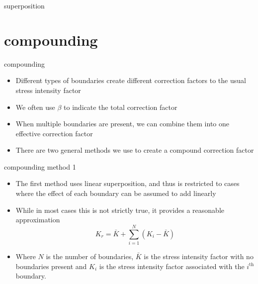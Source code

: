 \documentclass[10pt,handout]{beamer}
\begin{document}
\begin{frame}{superposition}
	\begin{figure}[H]
	\end{figure}
\end{frame}

\section{compounding}

\begin{frame}{compounding}
	\begin{itemize}
		\item Different types of boundaries create different correction factors to the usual stress intensity factor
		\item We often use $\beta$ to indicate the total correction factor
		\item When multiple boundaries are present, we can combine them into one effective correction factor
		\item There are two general methods we use to create a compound correction factor
	\end{itemize}
\end{frame}

\begin{frame}{compounding method 1}
	\begin{itemize}
		\item The first method uses linear superposition, and thus is restricted to cases where the effect of each boundary can be assumed to add linearly
		\item While in most cases this is not strictly true, it provides a reasonable approximation
		\begin{equation}
		K_r = \bar{K} + \sum_{i=1}^{N}(K_i - \bar{K})
		\end{equation}
		\item Where $N$ is the number of boundaries, $\bar{K}$ is the stress intensity factor with no boundaries present and $K_i$ is the stress intensity factor associated with the $i^{\text{th}}$ boundary.
	\end{itemize}
\end{frame}
\end{document}
